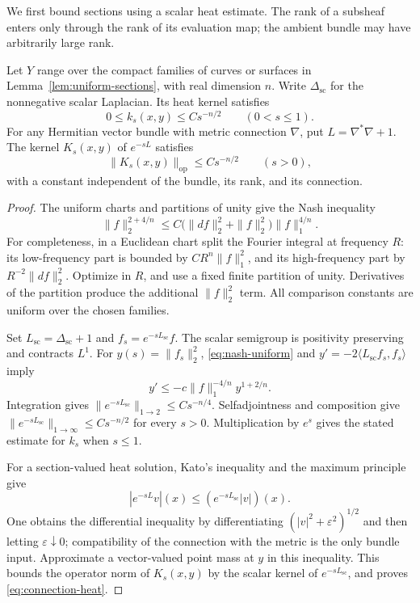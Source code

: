 We first bound sections using a scalar heat estimate.  The rank of a
subsheaf enters only through the rank of its evaluation map; the
ambient bundle may have arbitrarily large rank.

\begin{lemma}\label{lem:uniform-heat}
Let $Y$ range over the compact families of curves or surfaces in
Lemma~\ref{lem:uniform-sections}, with real dimension $n$.  Write
$\Delta_{\mathrm{sc}}$ for the nonnegative scalar Laplacian.  Its heat
kernel satisfies
\[
 0\le k_s(x,y)\le C s^{-n/2}\qquad(0<s\le1).
\]
For any Hermitian vector bundle with metric connection $\nabla$,
put $L=\nabla^*\nabla+1$.  The kernel $K_s(x,y)$ of $e^{-sL}$
satisfies
\begin{equation}\label{eq:connection-heat}
 \|K_s(x,y)\|_{\mathrm{op}}\le C s^{-n/2}
 \qquad(s>0),
\end{equation}
with a constant independent of the bundle, its rank, and its
connection.
\end{lemma}

\begin{proof}
The uniform charts and partitions of unity give the Nash inequality
\begin{equation}\label{eq:nash-uniform}
 \|f\|_2^{2+4/n}
 \le C\bigl(\|df\|_2^2+\|f\|_2^2\bigr)\|f\|_1^{4/n}.
\end{equation}
For completeness, in a Euclidean chart split the Fourier integral
at frequency $R$: its low-frequency part is bounded by
$CR^n\|f\|_1^2$, and its high-frequency part by
$R^{-2}\|df\|_2^2$.  Optimize in $R$, and use a fixed finite
partition of unity.  Derivatives of the partition produce the
additional $\|f\|_2^2$ term.  All comparison constants are uniform
over the chosen families.

Set $L_{\mathrm{sc}}=\Delta_{\mathrm{sc}}+1$ and
$f_s=e^{-sL_{\mathrm{sc}}}f$.
The scalar semigroup is positivity preserving and contracts $L^1$.
For $y(s)=\|f_s\|_2^2$, \eqref{eq:nash-uniform} and
$y'=-2\langle L_{\mathrm{sc}}f_s,f_s\rangle$ imply
\[
 y'\le-c\|f\|_1^{-4/n}y^{1+2/n}.
\]
Integration gives $\|e^{-sL_{\mathrm{sc}}}\|_{1\to2}\le Cs^{-n/4}$.
Selfadjointness and composition give
$\|e^{-sL_{\mathrm{sc}}}\|_{1\to\infty}\le Cs^{-n/2}$ for every $s>0$.
Multiplication by $e^s$ gives the stated estimate for $k_s$ when
$s\le1$.

For a section-valued heat solution, Kato's inequality and the
maximum principle give
\[
 |e^{-sL}v|(x)\le(e^{-sL_{\mathrm{sc}}}|v|)(x).
\]
One obtains the differential inequality by differentiating
$(|v|^2+\varepsilon^2)^{1/2}$ and then letting
$\varepsilon\downarrow0$; compatibility of the connection with the
metric is the only bundle input.  Approximate a vector-valued point
mass at $y$ in this inequality.  This bounds the operator norm of
$K_s(x,y)$ by the scalar kernel of $e^{-sL_{\mathrm{sc}}}$, and proves
\eqref{eq:connection-heat}.
\end{proof}

